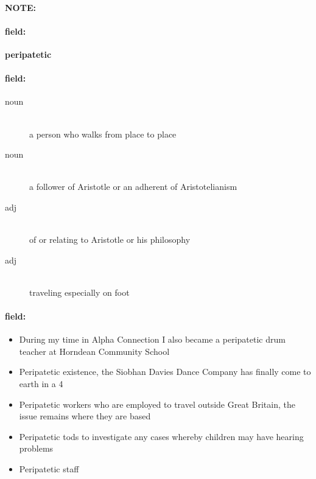 \documentclass[12pt]{article}
\newenvironment{note}{\paragraph{NOTE:}}{}
\newenvironment{field}{\paragraph{field:}}{}
\begin{document}
\begin{note}
\begin{field}
\textbf{\large peripatetic}
\end{field}


\begin{field}
\begin{description}
\item[noun] \hfill \\ 
a person who walks from place to place

\item[noun] \hfill \\ 
a follower of Aristotle or an adherent of Aristotelianism

\item[adj] \hfill \\ 
of or relating to Aristotle or his philosophy

\item[adj] \hfill \\ 
traveling especially on foot

\end{description}
\end{field}

\begin{field}
\begin{itemize}
\item During my time in Alpha Connection I also became a peripatetic drum teacher at Horndean Community School
\item Peripatetic existence, the Siobhan Davies Dance Company has finally come to earth in a  4
\item Peripatetic workers who are employed to travel outside Great Britain, the issue remains where they are based
\item Peripatetic tods to investigate any cases whereby children may have hearing problems
\item Peripatetic staff
\end{itemize}
\end{field}
\end{note}
\end{document}
